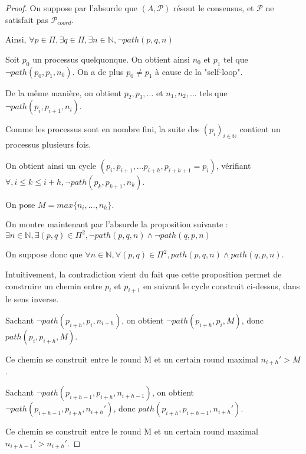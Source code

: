 \documentclass{article}
\begin{document}
\begin{proof}

On suppose par l'absurde que $(A, \mathcal{P})$ résout le consensus, et $\mathcal{P}$ ne satisfait pas $\mathcal{P}_{coord}$.

Ainsi, $\forall p \in \Pi, \exists q \in \Pi, \exists n \in \mathds{N}, \neg path(p, q, n)$ 

\vspace{0.5cm}

Soit $p_0$ un processus quelquonque. On obtient ainsi $n_0$ et $p_1$ tel que $\neg path(p_0, p_1, n_0)$. On a de plus $p_0 \neq p_1$ à cause de la "self-loop".

De la même manière, on obtient $p_2, p_3, ...$ et $n_1, n_2, ...$ tels que $\neg path(p_i, p_{i+1}, n_i)$. 

Comme les processus sont en nombre fini, la suite des $(p_i)_{i \in \mathds{N}}$ contient un processus plusieurs fois.

On obtient ainsi un cycle $(p_i, p_{i+1}, ... p_{i+h}, p_{i+h+1} =  p_i)$,
vérifiant $\forall, i \leq k \leq i+h, \neg path(p_k, p_{k+1}, n_k)$.

On pose $M = max \{ n_i, ..., n_h \}$.

\vspace{0.5cm}

On montre maintenant par l'absurde la proposition suivante :
$\exists n \in \mathds{N}, \exists (p, q) \in \Pi^2, \neg path(p,q, n) \wedge \neg path(q,p,n)$

On suppose donc que 
$\forall n \in \mathds{N}, \forall (p, q) \in \Pi^2, path(p,q, n) \wedge path(q,p,n)$.

Intuitivement, la contradiction vient du fait que cette proposition permet de construire un chemin
entre $p_i$ et $p_{i+1}$ en suivant le cycle construit ci-dessus, dans le sens inverse.

Sachant $\neg path(p_{i+h}, p_i, n_{i+h})$, on obtient $\neg path(p_{i+h}, p_i, M)$, donc
$path(p_i, p_{i+h}, M)$.

Ce chemin se construit entre le round M et un certain round maximal $n_{i+h}' > M$.

\vspace{0.2cm}

Sachant $\neg path(p_{i+h-1}, p_{i+h}, n_{i+h-1})$,
on obtient $\neg path(p_{i+h-1}, p_{i+h}, n_{i+h}')$,
donc $path(p_{i+h}, p_{i+h-1}, n_{i+h}')$.

Ce chemin se construit entre le round M et un certain round maximal $n_{i+h-1}' > n_{i+h}'$.


\end{proof}
\end{document}
